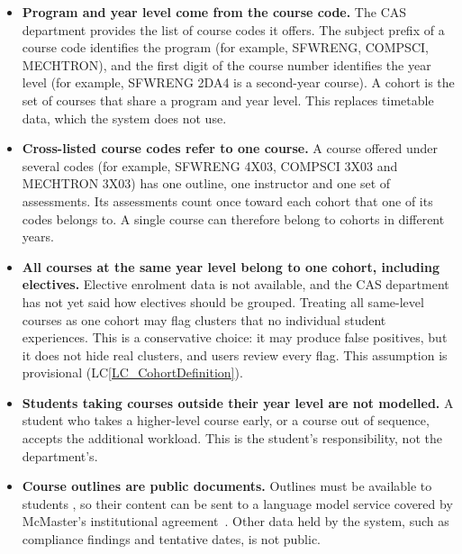 \documentclass[12pt]{article}
\newcommand{\lcref}[1]{LC\ref{#1}}
\newcounter{asnum} %
\begin{document}
\noindent \begin{itemize}

\item[A\refstepcounter{asnum}\theasnum \label{A_CourseCode}:] \textbf{Program
  and year level come from the course code.} The CAS department provides the
  list of course codes it offers. The subject prefix of a course code
  identifies the program (for example, SFWRENG, COMPSCI, MECHTRON), and the
  first digit of the course number identifies the year level (for example,
  SFWRENG 2DA4 is a second-year course). A cohort is the set of courses that
  share a program and year level. This replaces timetable data, which the
  system does not use.

\item[A\refstepcounter{asnum}\theasnum \label{A_CrossListed}:]
\textbf{Cross-listed course codes refer to one course.} A course offered under
several codes (for example, SFWRENG 4X03, COMPSCI 3X03 and MECHTRON 3X03) has
one outline, one instructor and one set of assessments. Its assessments count
once toward each cohort that one of its codes belongs to. A single course can
therefore belong to cohorts in different years.

\item[A\refstepcounter{asnum}\theasnum \label{A_Electives}:] \textbf{All
  courses at the same year level belong to one cohort, including electives.}
  Elective enrolment data is not available, and the CAS department has not yet
  said how electives should be grouped. Treating all same-level courses as one
  cohort may flag clusters that no individual student experiences. This is a
  conservative choice: it may produce false positives, but it does not hide
  real clusters, and users review every flag. This assumption is provisional
  (\lcref{LC_CohortDefinition}).

\item[A\refstepcounter{asnum}\theasnum \label{A_OffCycle}:] \textbf{Students
  taking courses outside their year level are not modelled.} A student who
  takes a higher-level course early, or a course out of sequence, accepts the
  additional workload. This is the student's responsibility, not the
  department's.

\item[A\refstepcounter{asnum}\theasnum \label{A_PublicOutlines}:]
  \textbf{Course outlines are public documents.} Outlines must be available to
  students \citep{McMasterUCMP2025}, so their content can be sent to a
  language model service covered by McMaster's institutional agreement~\citep{McMasterCopilot}. Other
  data held by the system, such as compliance findings and tentative dates, is
  not public.


\end{itemize}
\end{document}

